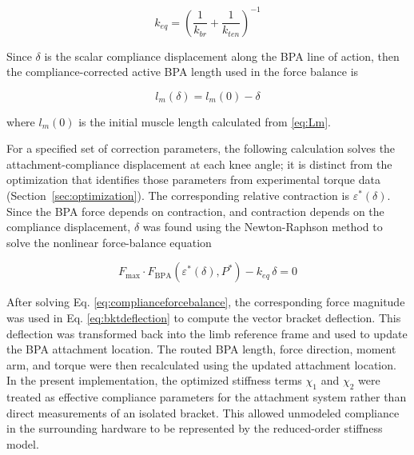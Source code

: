 \begin{equation} k_{eq} = \left( \frac{1}{k_{br}} + \frac{1}{k_{ten}} \right)^{-1}
\label{eq:equivalentstiffness}
\end{equation}

Since $\delta$ is the scalar compliance displacement along the BPA line of action, then the compliance-corrected active BPA length used in the force balance is

\begin{equation} l_m(\delta) = l_m{(0)} - \delta
\label{eq:activelengthcorrected}
\end{equation}

where $l_m{(0)}$ is the initial muscle length calculated from \eqref{eq:Lm}.

For a specified set of correction parameters, the following calculation solves the attachment-compliance displacement at each knee angle; it is distinct from the optimization that identifies those parameters from experimental torque data (Section~\ref{sec:optimization}). The corresponding relative contraction is $\varepsilon^*(\delta)$. Since the BPA force depends on contraction, and contraction depends on the compliance displacement, $\delta$ was found using the Newton-Raphson method to solve the nonlinear force-balance equation

\begin{equation} F_{\mathrm{max}} \cdot F_{\mathrm{BPA}}\!\left(\varepsilon^*(\delta),P^*\right) - k_{eq}\,\delta = 0
\label{eq:complianceforcebalance}
\end{equation}

After solving Eq. \ref{eq:complianceforcebalance}, the corresponding force magnitude was used in Eq. \ref{eq:bktdeflection} to compute the vector bracket deflection. This deflection was transformed back into the limb reference frame and used to update the BPA attachment location. The routed BPA length, force direction, moment arm, and torque were then recalculated using the updated attachment location. In the present implementation, the optimized stiffness terms $\chi_{1}$ and $\chi_{2}$ were treated as effective compliance parameters for the attachment system rather than direct measurements of an isolated bracket. This allowed unmodeled compliance in the surrounding hardware to be represented by the reduced-order stiffness model.





